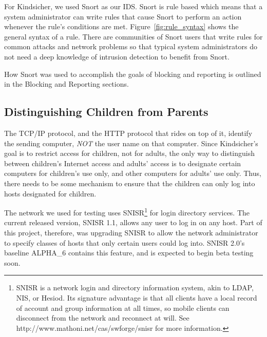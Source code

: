 For Kindsicher, we used Snort as our IDS.
%
Snort is rule based which means that a system administrator can write rules
that cause Snort to perform an action whenever the rule's conditions are met.
%
Figure~\ref{fig:rule_syntax} shows the general syntax of a rule. There are
communities of Snort users that write rules for common attacks and network
problems so that typical system administrators do not need a deep knowledge of
intrusion detection to benefit from Snort.

How Snort was used to accomplish the goals of blocking and reporting is outlined
in the Blocking and Reporting sections.

\vspace{5mm} 

\subsection{Distinguishing Children from Parents}

The TCP/IP protocol, and the HTTP protocol that rides on top of it, identify
the sending computer, \emph{NOT} the user name on that computer.
%
Since Kindsicher's goal is to restrict access for children, not for adults,
the only way to distinguish between children's Internet access and adults'
access is to designate certain computers for children's use only, and other
computers for adults' use only.
%
Thus, there needs to be some mechanism to ensure that the children can only
log into hosts designated for children.

The network we used for testing uses SNISR\footnote{SNISR is a network login
and directory information system, akin to LDAP, NIS, or Hesiod.  Its
signature advantage is that all clients have a local record of account and
group information at all times, so mobile clients can disconnect from the
network and reconnect at will. See http://www.mathoni.net/cas/swforge/snisr
for more information.}
%
for login directory services.
%
The current released version, SNISR 1.1, allows any user to log in on any host.
%
Part of this project, therefore, was upgrading SNISR to allow the network
administrator to specify classes of hosts that only certain users could log
into.
%
SNISR 2.0's baseline ALPHA\_6 contains this feature, and is expected to begin
beta testing soon.


